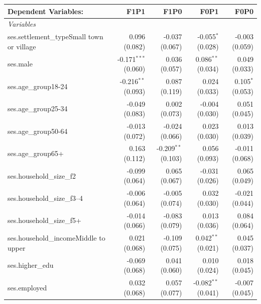 \begingroup
\centering
\begin{tabular}{lrrrr}
	Dependent Variables:                                            & F1P1                   & F1P0                   & F0P1                  & F0P0\\  
	\midrule
	\emph{Variables}\\
	ses.settlement\_typeSmall town or village                       & 0.096 (0.082)          & -0.037 (0.067)         & -0.055$^{*}$ (0.028)  & -0.003 (0.059)\\   
	ses.male                                                        & -0.171$^{***}$ (0.060) & 0.036 (0.057)          & 0.086$^{**}$ (0.034)  & 0.049 (0.033)\\   
	ses.age\_group18-24                                             & -0.216$^{**}$ (0.093)  & 0.087 (0.119)          & 0.024 (0.033)         & 0.105$^{*}$ (0.053)\\   
	ses.age\_group25-34                                             & -0.049 (0.083)         & 0.002 (0.073)          & -0.004 (0.030)        & 0.051 (0.045)\\   
	ses.age\_group50-64                                             & -0.013 (0.072)         & -0.024 (0.066)         & 0.023 (0.030)         & 0.013 (0.039)\\   
	ses.age\_group65+                                               & 0.163 (0.112)          & -0.209$^{**}$ (0.103)  & 0.056 (0.093)         & -0.011 (0.068)\\   
	ses.household\_size\_f2                                         & -0.099 (0.064)         & 0.065 (0.067)          & -0.031 (0.026)        & 0.065 (0.049)\\   
	ses.household\_size\_f3--4                                      & -0.006 (0.064)         & -0.005 (0.074)         & 0.032 (0.030)         & -0.021 (0.044)\\   
	ses.household\_size\_f5+                                        & -0.014 (0.066)         & -0.083 (0.079)         & 0.013 (0.036)         & 0.084 (0.064)\\   
	ses.household\_incomeMiddle to upper                            & 0.021 (0.068)          & -0.109 (0.075)         & 0.042$^{**}$ (0.021)  & 0.045 (0.037)\\   
	ses.higher\_edu                                                 & -0.069 (0.068)         & 0.041 (0.060)          & 0.010 (0.024)         & 0.018 (0.045)\\   
	ses.employed                                                    & 0.032 (0.068)          & 0.057 (0.077)          & -0.082$^{**}$ (0.041) & -0.007 (0.045)\\   

\end{tabular}

